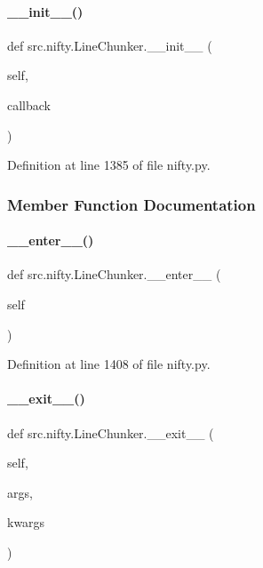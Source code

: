 \paragraph{\texorpdfstring{\+\_\+\+\_\+init\+\_\+\+\_\+()}{\_\_init\_\_()}}
{\footnotesize\ttfamily def src.\+nifty.\+Line\+Chunker.\+\_\+\+\_\+init\+\_\+\+\_\+ (\begin{DoxyParamCaption}\item[{}]{self,  }\item[{}]{callback }\end{DoxyParamCaption})}



Definition at line 1385 of file nifty.\+py.



\subsubsection{Member Function Documentation}
\mbox{\label{classsrc_1_1nifty_1_1LineChunker_a4f69d674b7b5db51a531fef4b70dde66}} 
\paragraph{\texorpdfstring{\+\_\+\+\_\+enter\+\_\+\+\_\+()}{\_\_enter\_\_()}}
{\footnotesize\ttfamily def src.\+nifty.\+Line\+Chunker.\+\_\+\+\_\+enter\+\_\+\+\_\+ (\begin{DoxyParamCaption}\item[{}]{self }\end{DoxyParamCaption})}



Definition at line 1408 of file nifty.\+py.

\mbox{\label{classsrc_1_1nifty_1_1LineChunker_afb2404f043fe01c296966415c29af251}} 
\paragraph{\texorpdfstring{\+\_\+\+\_\+exit\+\_\+\+\_\+()}{\_\_exit\_\_()}}
{\footnotesize\ttfamily def src.\+nifty.\+Line\+Chunker.\+\_\+\+\_\+exit\+\_\+\+\_\+ (\begin{DoxyParamCaption}\item[{}]{self,  }\item[{}]{args,  }\item[{}]{kwargs }\end{DoxyParamCaption})}



